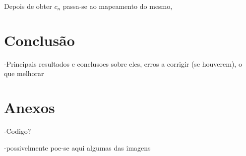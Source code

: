 \documentclass[11pt]{article}
\begin{document}
\vspace{-0.4cm}
Depois de obter $ c_n $ passa-se ao mapeamento do mesmo,




\section{Conclusão}
-Principais resultados e conclusoes sobre eles, erros a corrigir (se houverem), o que melhorar

\section{Anexos}
-Codigo?

-possivelmente poe-se aqui algumas das imagens	
\end{document}
